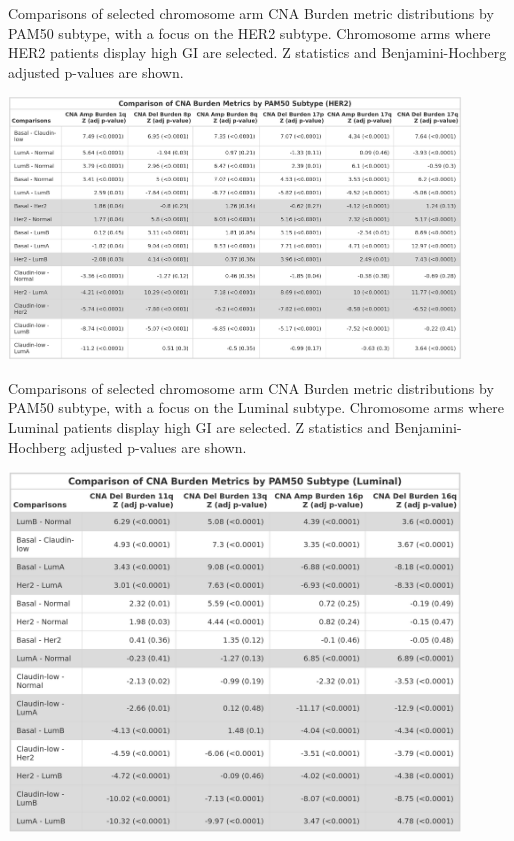 \begin{table}[!htb]
\center
\caption[Comparisons of selected chromosome arm CNA Burden metric distributions by PAM50 subtype, with a focus on the HER2 subtype.]{Comparisons of selected chromosome arm CNA Burden metric distributions by PAM50 subtype, with a focus on the HER2 subtype. Chromosome arms where HER2 patients display high GI are selected. Z statistics and Benjamini-Hochberg adjusted p-values are shown.}
\includegraphics[width=0.9\textwidth]{../tables/Chapter_2/ChrArm_CNA_Burden_Metric_Comparisons_HER2.png}
\label{tab:PA-CNA-Score-Metric-Density-P50-17q}
\end{table}

\begin{table}[!htb]
\center
\caption[Comparisons of selected chromosome arm CNA Burden metric distributions by PAM50 subtype, with a focus on the Luminal subtype.]{Comparisons of selected chromosome arm CNA Burden metric distributions by PAM50 subtype, with a focus on the Luminal subtype. Chromosome arms where Luminal patients display high GI are selected. Z statistics and Benjamini-Hochberg adjusted p-values are shown.}
\includegraphics[width=0.9\textwidth]{../tables/Chapter_2/ChrArm_CNA_Burden_Metric_Comparisons_Luminal.png}
\label{tab:PA-CNA-Score-Metric-Density-P50-16q}
\end{table}


